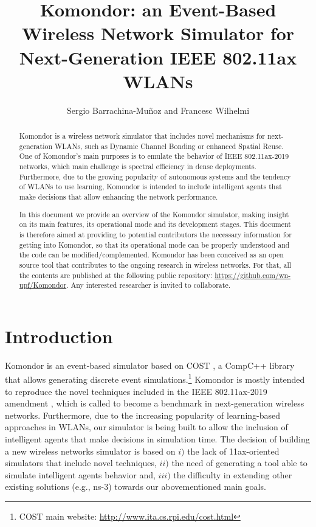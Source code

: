 \documentclass[a4paper]{article}
\title{Komondor: an Event-Based Wireless Network Simulator for Next-Generation IEEE 802.11ax WLANs}
\author{Sergio Barrachina-Mu\~noz and Francesc Wilhelmi}
\begin{document}
\maketitle

\begin{abstract}
Komondor is a wireless network simulator that includes novel mechanisms for next-generation WLANs, such as Dynamic Channel Bonding or enhanced Spatial Reuse. One of Komondor's main purposes is to emulate the behavior of IEEE 802.11ax-2019 networks, which main challenge is spectral efficiency in dense deployments. Furthermore, due to the growing popularity of autonomous systems and the tendency of WLANs to use learning, Komondor is intended to include intelligent agents that make decisions that allow enhancing the network performance. 

In this document we provide an overview of the Komondor simulator, making insight on its main features, its operational mode and its development stages. This document is therefore aimed at providing to potential contributors the necessary information for getting into Komondor, so that its operational mode can be properly understood and the code can be modified/complemented. Komondor has been conceived as an open source tool that contributes to the ongoing research in wireless networks. For that, all the contents are published at the following public repository: \url{https://github.com/wn-upf/Komondor}. Any interested researcher is invited to collaborate.

\end{abstract}

\tableofcontents

\listoffigures

\listoftables

\newpage

\section{Introduction}
\label{section:introduction}

Komondor \cite{barrachina2017komondor} is an event-based simulator based on COST \cite{chen2002reusing}, a CompC++ library that allows generating discrete event simulations.\footnote{COST main website: \url{http://www.ita.cs.rpi.edu/cost.html}} Komondor is mostly intended to reproduce the novel techniques included in the IEEE 802.11ax-2019 amendment \cite{tgax2017draft}, which is called to become a benchmark in next-generation wireless networks. Furthermore, due to the increasing popularity of learning-based approaches in WLANs, our simulator is being built to allow the inclusion of intelligent agents that make decisions in simulation time. The decision of building a new wireless networks simulator is based on $i)$ the lack of 11ax-oriented simulators that include novel techniques, $ii)$ the need of generating a tool able to simulate intelligent agents behavior and, $iii)$ the difficulty in extending other existing solutions (e.g., ns-3) towards our abovementioned main goals. 
	
\end{document}
